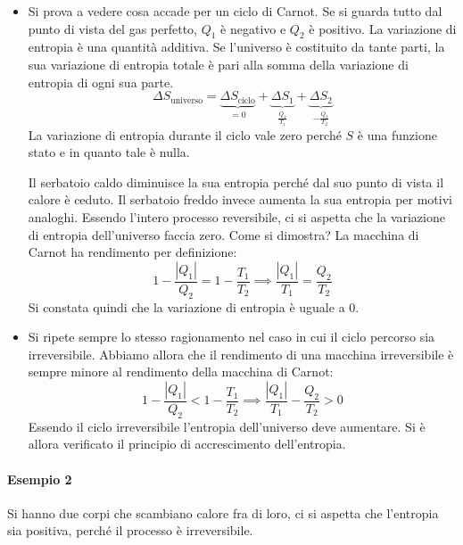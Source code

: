 \begin{itemize}
	\item Si prova a vedere cosa accade per un ciclo di Carnot. Se si guarda tutto dal punto di vista del gas perfetto, $Q_1$ è negativo e $Q_2$ è positivo. La variazione di entropia è una quantità additiva. Se l'universo è costituito da tante parti, la sua variazione di entropia totale è pari alla somma della variazione di entropia di ogni sua parte.
	\[
		\Delta S_{\text{universo}} = \underbrace{\Delta S_{\text{ciclo}}}_{=0} + \underbrace{\Delta S_1}_{\frac{Q_1 }{T_1 }} + \underbrace{\Delta S_2}_{-\frac{Q_2 }{T_2 }}
	\]
	La variazione di entropia durante il ciclo vale zero perché $S$ è una funzione stato e in quanto tale è nulla.
	
	Il serbatoio caldo diminuisce la sua entropia perché dal suo punto di vista il calore è ceduto. Il serbatoio freddo invece aumenta la sua entropia per motivi analoghi. Essendo l'intero processo reversibile, ci si aspetta che la variazione di entropia dell'universo faccia zero. Come si dimostra?  La macchina di Carnot ha rendimento per definizione:
	\[
		1 - \frac{|Q_1|}{Q_2 } = 1 - \frac{T_1 }{T_2 } \implies \frac{|Q_1|}{T_1 } = \frac{Q_2 }{T_2 }
	\]
	Si constata quindi che la variazione di entropia è uguale a $0$.
	\item Si ripete sempre lo stesso ragionamento nel caso in cui il ciclo percorso sia irreversibile. Abbiamo allora che il rendimento di una macchina irreversibile è sempre minore al rendimento della macchina di Carnot:
	\[
		1 - \frac{|Q_1|}{Q_2 } < 1 - \frac{T_1 }{T_2 } \implies \frac{|Q_1|}{T_1 } - \frac{Q_2 }{T_2 } > 0
	\]
	Essendo il ciclo irreversibile l'entropia dell'universo deve aumentare. Si è allora verificato il principio di accrescimento dell'entropia.
\end{itemize}

\paragraph{Esempio 2} Si hanno due corpi che scambiano calore fra di loro, ci si aspetta che l'entropia sia positiva, perché il processo è irreversibile.

